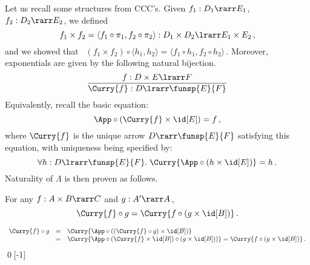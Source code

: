 \documentclass[12pt]{article}
\begin{document}
Let us recall some structures from CCC's. Given $f_{1} : D_{1} \rarr E_{1}$,   $f_{2} : D_{2} \rarr E_{2}$, we defined
\[ f_{1} \times f_{2}  = \langle f_{1} \circ \pi_{1},  f_{2} \circ \pi_{2} \rangle : D_{1} \times D_{2} \lrarr E_{1} \times E_{2}\,, \]
and we showed that \ $(f_1\times f_2)\circ\langle h_1,h_2\rangle = \langle f_1\circ h_1, f_2\circ h_2\rangle$\,.
%
Moreover, exponentials are given by the following natural bijection.
\[ \frac{f : D \times E \lrarr F}{\Curry{f} : D \lrarr \funsp{E}{F}} \]
Equivalently, recall the basic equation:
\[ \App \circ (\Curry{f} \times \id[E] ) = f\,, \]
where $\Curry{f}$ is the unique arrow $D\rarr\funsp{E}{F}$ satisfying this equation, with uniqueness being specified by:
\[ \forall h : D \lrarr \funsp{E}{F}. \; \Curry{\App \circ (h \times \id[E])} = h\,. \]
%
Naturality of $\Lambda$ is then proven as follows.

\begin{myproposition}%
\label{p:Curry}
For any $f:A\times B\rarr C$ and $g:A'\rarr A$\,,
\[ \Curry{f} \circ g = \Curry{f \circ (g \times \id[B])}\,. \]
\end{myproposition}
\proof
\[ \begin{array}{rcl}
 \Curry{f} \circ g & = & \Curry{\App \circ ((\Curry{f} \circ g) \times \id[B])} \\
 & = & \Curry{\App \circ (\Curry{f}\times \id[B]) \circ (g \times \id[B])) } = \Curry{f \circ (g \times \id[B])}\,.
\end{array}\]
\qed[-1]
\end{document}
